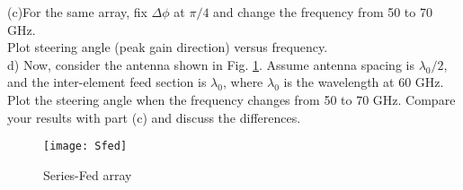 \documentclass[paper=a4, fontsize=11pt]{scrartcl} %
\numberwithin{equation}{section} %
\numberwithin{figure}{section} %
\numberwithin{table}{section} %
\begin{document}
(c)For the same array, fix $\Delta\phi$ at $\pi/4$ and change the frequency from 50 to 70 GHz.\\  Plot steering angle (peak gain direction) versus frequency.\\

d) Now, consider the antenna shown in Fig. \ref{Fig3}. Assume antenna spacing is $\lambda_0/2$, and the inter-element feed section is  $\lambda_0$, where $\lambda_0$ is the wavelength at 60 GHz. Plot the steering angle when the frequency changes from 50 to 70 GHz. Compare your results with part (c) and discuss the differences.

\begin{figure}[h]
\centering
\texttt{[image: Sfed]}
\caption{Series-Fed array}
\label{Fig3}
\end{figure}



\end{document}

